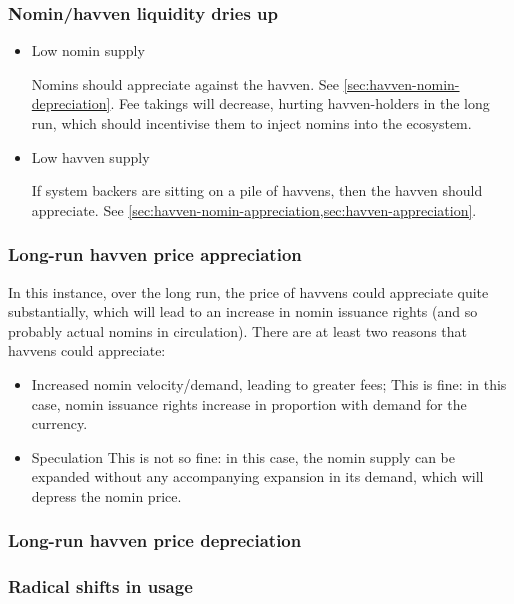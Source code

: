 \subsubsection{Nomin/havven liquidity dries up}
\begin{itemize}
	\item Low nomin supply

	Nomins should appreciate against the havven. See \cref{sec:havven-nomin-depreciation}.
	Fee takings will decrease, hurting havven-holders in the long run,
	which should incentivise them to inject nomins into the ecosystem.

	\item Low havven supply

	If system backers are sitting on a pile of havvens, then the havven should
	appreciate. See \cref{sec:havven-nomin-appreciation,sec:havven-appreciation}.
\end{itemize}


\subsubsection{Long-run havven price appreciation}\label{sec:havven-appreciation}
In this instance, over the long run, the price of havvens could appreciate quite substantially,
which will lead to an increase in nomin issuance rights (and so probably actual nomins in circulation).
There are at least two reasons that havvens could appreciate:
\begin{itemize}
	\item Increased nomin velocity/demand, leading to greater fees;
	This is fine: in this case, nomin issuance rights increase in proportion with demand for the currency.

	\item Speculation
	This is not so fine: in this case, the nomin supply can be expanded without any accompanying
	expansion in its demand, which will depress the nomin price.
\end{itemize}

\subsubsection{Long-run havven price depreciation}\label{sec:havven-depreciation}

\subsubsection{Radical shifts in usage}

